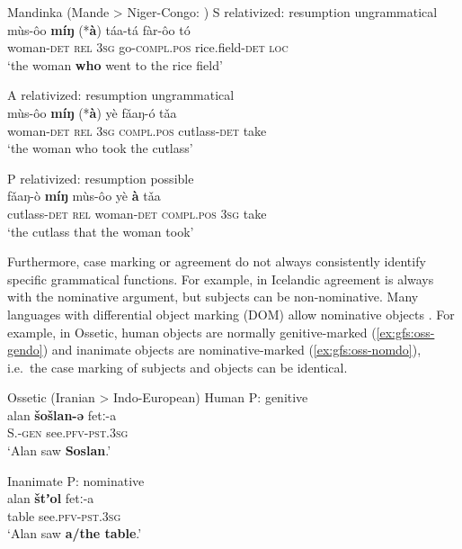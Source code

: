 \documentclass[output=paper]{../langscibook}
\begin{document}
 \ea\label{ex:gfs:mandinka} Mandinka (Mande > Niger-Congo: \citealt[339]{creissels2019})
   \ea S relativized: resumption ungrammatical\\
   \gll mùs-ôo \textbf{míŋ} (*\textbf{à}) táa-tá fàr-ôo tó\\
   woman-\textsc{det} \textsc{rel} \phantom{(*}\textsc{3sg} go-\textsc{compl.pos} rice.field-\textsc{det} \textsc{loc}\\
   \trans `the woman \textbf{who} went to the rice field'
   
   \ex A relativized: resumption ungrammatical\\
   \gll mùs-ôo \textbf{míŋ} (*\textbf{à}) yè fǎaŋ-ó tǎa\\
   woman-\textsc{det} \textsc{rel} \phantom{(*}\textsc{3sg} \textsc{compl.pos} cutlass-\textsc{det} take\\
   \trans `the woman who took the cutlass'
   
   \ex P relativized: resumption possible\\
   \gll fǎaŋ-ò \textbf{míŋ} mùs-ôo yè \textbf{à} tǎa\\
   cutlass-\textsc{det} \textsc{rel} woman-\textsc{det} \textsc{compl.pos} \textsc{3sg} take\\
   \trans `the cutlass that the woman took'
   \z
 \z
 
 Furthermore, case marking or agreement do not always consistently identify specific grammatical functions. For example, in Icelandic \citep{Andrews82} agreement is always with the nominative argument, but subjects can be non-nom\-i\-na\-tive. Many languages with differential object marking (DOM) allow nominative objects \citep{DN}. For example, in Ossetic, human objects are normally genitive-marked (\ref{ex:gfs:oss-gendo}) and inanimate objects are nominative-marked (\ref{ex:gfs:oss-nomdo}), i.e.\ the case marking of subjects and objects can be identical.
 
 \ea Ossetic (Iranian > Indo-European)
 \ea\label{ex:gfs:oss-gendo} Human P: genitive\\
 \gll alan \textbf{šošlan-ə} fetː-a\\
 {} S.-\textsc{gen} see.\textsc{pfv-pst.3sg}\\
 \trans `Alan saw \textbf{Soslan}.'
 
 \ex\label{ex:gfs:oss-nomdo} Inanimate P: nominative\\
 \gll alan \textbf{štʼol} fetː-a\\
 {} table see.\textsc{pfv-pst.3sg}\\
 \trans `Alan saw \textbf{a/the table}.'
 \z
 \z
 
\end{document}
